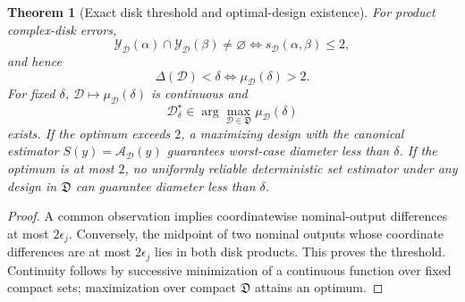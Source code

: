 \documentclass[11pt]{article}
\newtheorem{theorem}{Theorem}
\theoremstyle{definition}
\theoremstyle{remark}
\newcommand{\Aset}{\mathcal A}
\newcommand{\Yset}{\mathcal Y}
\begin{document}
\begin{theorem}[Exact disk threshold and optimal-design existence]
\label{thm:design}
For product complex-disk errors,
\[
 \Yset_{\mathcal D}(\alpha)\cap\Yset_{\mathcal D}(\beta)\ne\varnothing
 \iff s_{\mathcal D}(\alpha,\beta)\le2,
\]
and hence
\[
 \Delta(\mathcal D)<\delta
 \iff \mu_{\mathcal D}(\delta)>2.
\]
For fixed \(\delta\), \(\mathcal D\mapsto\mu_{\mathcal D}(\delta)\) is
continuous and
\[
 \mathcal D_\delta^\star\in
 \arg\max_{\mathcal D\in\mathfrak D}\mu_{\mathcal D}(\delta)
\]
exists.  If the optimum exceeds \(2\), a maximizing design with the canonical
estimator \(S(y)=\Aset_{\mathcal D}(y)\) guarantees worst-case diameter less
than \(\delta\).  If the optimum is at most \(2\), no uniformly reliable
deterministic set estimator under any design in \(\mathfrak D\) can guarantee
diameter less than \(\delta\).
\end{theorem}
\begin{proof}
A common observation implies coordinatewise nominal-output differences at
most \(2\epsilon_j\).  Conversely, the midpoint of two nominal outputs whose
coordinate differences are at most \(2\epsilon_j\) lies in both disk products.
This proves the threshold.  Continuity follows by successive minimization of
a continuous function over fixed compact sets; maximization over compact
\(\mathfrak D\) attains an optimum.
\end{proof}
\end{document}
